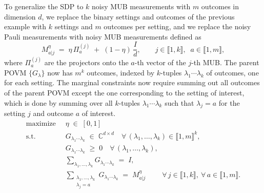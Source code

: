 \documentclass[oneside, a4paper, onecolumn, 11pt]{article}
\theoremstyle{definition}
\theoremstyle{plain}
\theoremstyle{remark}
\begin{document}



To generalize the SDP to $k$ noisy MUB measurements with $m$ outcomes in dimension $d$, we replace the binary settings and outcomes of the previous example with $k$ settings and $m$ outcomes per setting, and we replace the noisy Pauli measurements with noisy MUB measurements defined as
\begin{equation}
  M^{\eta}_{a|j} \;=\; \eta\, \Pi^{(j)}_{a}
                  \;+\; (1-\eta)\, \frac{I}{d},
  \qquad j \in \llbracket 1, k \rrbracket,\;\; a \in \llbracket 1, m \rrbracket,
  \label{eq:noisy-mub-kmub}
\end{equation}where $\Pi^{(j)}_{a}$ are the projectors onto the $a$-th vector of the $j$-th MUB. The parent POVM $\{G_{\lambda}\}$ now has $m^k$ outcomes, indexed by $k$-tuples $\lambda_1 \cdots \lambda_k$ of outcomes, one for each setting. The marginal constraints now require summing out all outcomes of the parent POVM except the one corresponding to the
setting of interest, which is done by summing over all $k$-tuples $\lambda_1 \cdots \lambda_k$ such that $\lambda_j = a$ for the setting $j$ and outcome $a$ of interest.
\begin{equation}
\begin{aligned}
  \text{maximize} \;\;& \eta \;\in\; [0,1] \\[2pt]
  \text{s.t.}   \;\;& G_{\lambda_1 \cdots \lambda_k} \;\in\; \mathbb{C}^{d \times d}
                      \quad \forall\, (\lambda_1, \dots, \lambda_k)
                      \in \llbracket 1, m \rrbracket^{k}, \\[2pt]
                  \;\;& G_{\lambda_1 \cdots \lambda_k} \;\geq\; 0
                      \quad \forall\, (\lambda_1, \dots, \lambda_k), \\[2pt]
                  \;\;& \sum_{\lambda_1, \dots, \lambda_k}
                        G_{\lambda_1 \cdots \lambda_k} \;=\; I, \\[2pt]
                  \;\;& \sum_{\substack{\lambda_1, \dots, \lambda_k \\ \lambda_j = a}}
                        G_{\lambda_1 \cdots \lambda_k} \;=\; M^{\eta}_{a | j}
                        \qquad\; \forall\, j \in \llbracket 1, k \rrbracket,\ \forall\, a \in \llbracket 1, m \rrbracket.
\end{aligned} %
\label{eq:sdp-robustness-kmub}
\end{equation}
\end{document}
